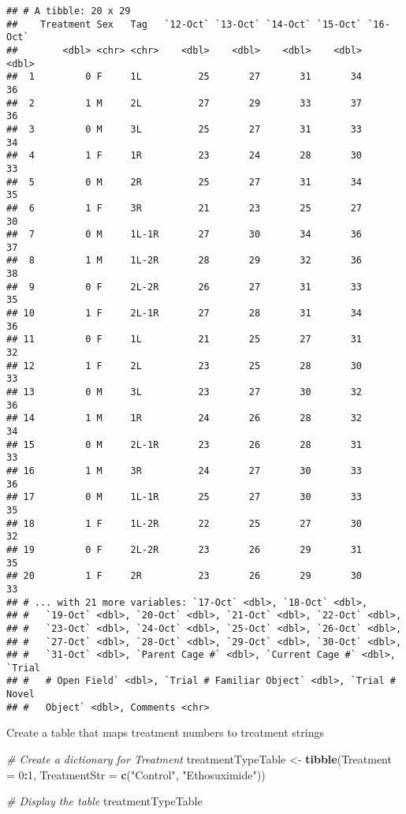\documentclass[]{article}
\newenvironment{Shaded}{\begin{snugshade}}{\end{snugshade}}
\newcommand{\KeywordTok}[1]{\textcolor[rgb]{0.13,0.29,0.53}{\textbf{#1}}}
\newcommand{\DataTypeTok}[1]{\textcolor[rgb]{0.13,0.29,0.53}{#1}}
\newcommand{\DecValTok}[1]{\textcolor[rgb]{0.00,0.00,0.81}{#1}}
\newcommand{\StringTok}[1]{\textcolor[rgb]{0.31,0.60,0.02}{#1}}
\newcommand{\CommentTok}[1]{\textcolor[rgb]{0.56,0.35,0.01}{\textit{#1}}}
\newcommand{\OperatorTok}[1]{\textcolor[rgb]{0.81,0.36,0.00}{\textbf{#1}}}
\newcommand{\NormalTok}[1]{#1}
\begin{document}
\begin{verbatim}
## # A tibble: 20 x 29
##    Treatment Sex   Tag   `12-Oct` `13-Oct` `14-Oct` `15-Oct` `16-Oct`
##        <dbl> <chr> <chr>    <dbl>    <dbl>    <dbl>    <dbl>    <dbl>
##  1         0 F     1L          25       27       31       34       36
##  2         1 M     2L          27       29       33       37       36
##  3         0 M     3L          25       27       31       33       34
##  4         1 F     1R          23       24       28       30       33
##  5         0 M     2R          25       27       31       34       35
##  6         1 F     3R          21       23       25       27       30
##  7         0 M     1L-1R       27       30       34       36       37
##  8         1 M     1L-2R       28       29       32       36       38
##  9         0 F     2L-2R       26       27       31       33       35
## 10         1 F     2L-1R       27       28       31       34       36
## 11         0 F     1L          21       25       27       31       32
## 12         1 F     2L          23       25       28       30       33
## 13         0 M     3L          23       27       30       32       36
## 14         1 M     1R          24       26       28       32       34
## 15         0 M     2L-1R       23       26       28       31       33
## 16         1 M     3R          24       27       30       33       36
## 17         0 M     1L-1R       25       27       30       33       35
## 18         1 F     1L-2R       22       25       27       30       32
## 19         0 F     2L-2R       23       26       29       31       35
## 20         1 F     2R          23       26       29       30       33
## # ... with 21 more variables: `17-Oct` <dbl>, `18-Oct` <dbl>,
## #   `19-Oct` <dbl>, `20-Oct` <dbl>, `21-Oct` <dbl>, `22-Oct` <dbl>,
## #   `23-Oct` <dbl>, `24-Oct` <dbl>, `25-Oct` <dbl>, `26-Oct` <dbl>,
## #   `27-Oct` <dbl>, `28-Oct` <dbl>, `29-Oct` <dbl>, `30-Oct` <dbl>,
## #   `31-Oct` <dbl>, `Parent Cage #` <dbl>, `Current Cage #` <dbl>, `Trial
## #   # Open Field` <dbl>, `Trial # Familiar Object` <dbl>, `Trial # Novel
## #   Object` <dbl>, Comments <chr>
\end{verbatim}

Create a table that maps treatment numbers to treatment strings

\begin{Shaded}
\begin{Highlighting}[]
\CommentTok{# Create a dictionary for Treatment}
\NormalTok{treatmentTypeTable <-}\StringTok{ }
\StringTok{    }\KeywordTok{tibble}\NormalTok{(}\DataTypeTok{Treatment =} \DecValTok{0}\OperatorTok{:}\DecValTok{1}\NormalTok{, }\DataTypeTok{TreatmentStr =} \KeywordTok{c}\NormalTok{(}\StringTok{"Control"}\NormalTok{, }\StringTok{"Ethosuximide"}\NormalTok{))}

\CommentTok{# Display the table}
\NormalTok{treatmentTypeTable}
\end{Highlighting}
\end{Shaded}
\end{document}
